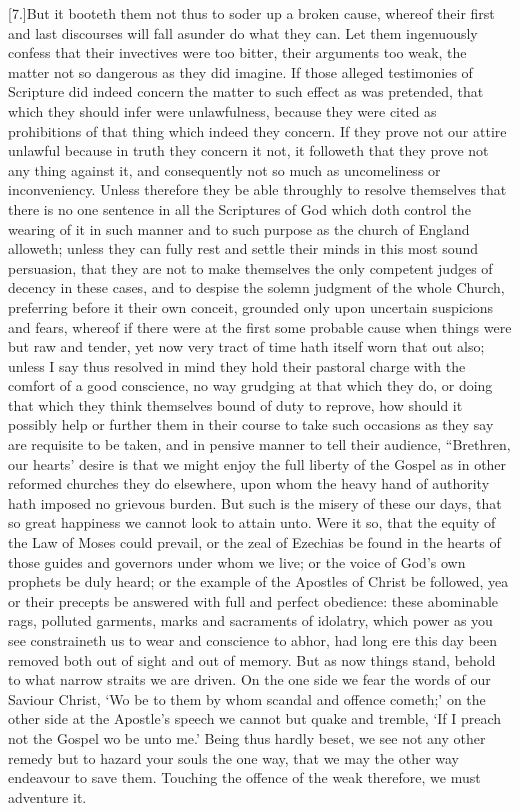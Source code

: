 [7.]But it booteth them not thus to soder up a broken cause, whereof their first and last discourses will fall asunder do what they can. Let them ingenuously confess that their invectives were too bitter, their arguments too weak, the matter not so dangerous as they did imagine. If those alleged testimonies of Scripture did indeed concern the matter to such effect as was pretended, that which they should infer were unlawfulness, because they were cited as prohibitions of that thing which indeed they concern. If they prove not our attire unlawful because in truth they concern it not, it followeth that they prove not any thing against it, and consequently not so much as uncomeliness or inconveniency. Unless therefore they be able throughly to resolve themselves that there is no  one sentence in all the Scriptures of God which doth control the wearing of it in such manner and to such purpose as the church of England alloweth; unless they can fully rest and settle their minds in this most sound persuasion, that they are not to make themselves the only competent judges of decency in these cases, and to despise the solemn judgment of the whole Church, preferring before it their own conceit, grounded only upon uncertain suspicions and fears, whereof if there were at the first some probable cause when things were but raw and tender, yet now very tract of time hath itself worn that out also; unless I say thus resolved in mind they hold their pastoral charge with the comfort of a good conscience, no way grudging at that which they do, or doing that which they think themselves bound of duty to reprove, how should it possibly help or further them in their course to take such occasions as they say are requisite to be taken, and in pensive manner to tell their audience, “Brethren, our hearts’ desire is that we might enjoy the full liberty of the Gospel as in other reformed churches they do elsewhere, upon whom the heavy hand of authority hath imposed no grievous burden. But such is the misery of these our days, that so great happiness we cannot look to attain unto. Were it so, that the equity of the Law of Moses could prevail, or the zeal of Ezechias be found in the hearts of those guides and governors under whom we live; or the voice of God’s own prophets be duly heard; or the example of the Apostles of Christ be followed, yea or their precepts be answered with full and perfect obedience: these abominable rags, polluted garments, marks and sacraments of idolatry, which power as you see constraineth us to wear and conscience to abhor, had long ere this day been removed both out of sight and out of memory. But as now things stand, behold to what narrow straits we are driven. On the one side we fear the words of our Saviour Christ, ‘Wo be to them by whom scandal and offence cometh;’ on the other side at the Apostle’s speech we cannot but quake and tremble, ‘If I preach not the Gospel wo be unto me.’ Being thus hardly beset, we see not any other remedy but to hazard your souls the one way, that we may the other way endeavour to save them. Touching the offence of the weak therefore, we must  adventure it.
